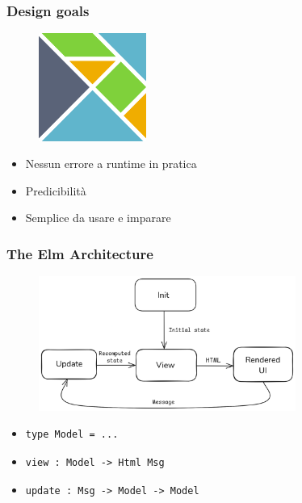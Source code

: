 \documentclass{beamer}
\begin{document}
\begin{frame}
  \frametitle{Design goals}
  \begin{figure}
    \centering
    \includegraphics[height=100pt]{assets/elm-logo.png}
  \end{figure}
  \begin{itemize}
      \item Nessun errore a runtime in pratica
      \item Predicibilità
      \item Semplice da usare e imparare
  \end{itemize}
\end{frame}

\begin{frame}[containsverbatim]
  \frametitle{The Elm Architecture}
  \begin{figure}
    \centering
    \includegraphics[height=125pt]{assets/elm-architecture.png}
  \end{figure}
  \begin{itemize}
      \item\begin{verbatim}
type Model = ...
      \end{verbatim}
      \item\begin{verbatim}
view : Model -> Html Msg
      \end{verbatim}
      \item\begin{verbatim}
update : Msg -> Model -> Model
      \end{verbatim}
  \end{itemize}

\end{frame}
\end{document}
